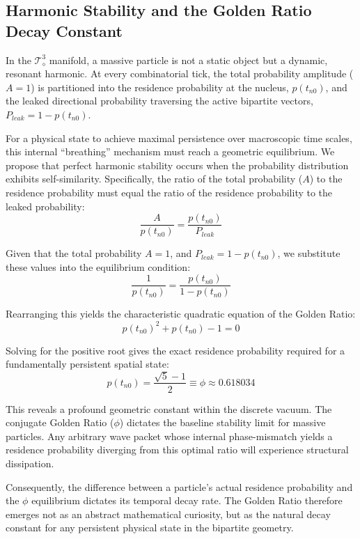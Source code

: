 \subsection{Harmonic Stability and the Golden Ratio Decay Constant}
\label{subsec:golden_ratio}

In the $\mathcal{T}_\diamond^3$ manifold, a massive particle is not a static object but
a dynamic, resonant harmonic. At every combinatorial tick, the total probability 
amplitude ($A=1$) is partitioned into the residence probability at the nucleus, 
$p(t_{n0})$, and the leaked directional probability traversing the active bipartite 
vectors, $P_{leak} = 1 - p(t_{n0})$. 

For a physical state to achieve maximal persistence over macroscopic time scales, 
this internal ``breathing'' mechanism must reach a geometric equilibrium. We propose 
that perfect harmonic stability occurs when the probability distribution exhibits 
self-similarity. Specifically, the ratio of the total probability ($A$) to the 
residence probability must equal the ratio of the residence probability to the leaked 
probability:
\begin{equation}
    \frac{A}{p(t_{n0})} = \frac{p(t_{n0})}{P_{leak}}
\end{equation}

Given that the total probability $A = 1$, and $P_{leak} = 1 - p(t_{n0})$, we substitute these 
values into the equilibrium condition:
\begin{equation}
    \frac{1}{p(t_{n0})} = \frac{p(t_{n0})}{1 - p(t_{n0})}
\end{equation}

Rearranging this yields the characteristic quadratic equation of the Golden Ratio:
\begin{equation}
    p(t_{n0})^2 + p(t_{n0}) - 1 = 0
\end{equation}

Solving for the positive root gives the exact residence probability required for a fundamentally persistent spatial state:
\begin{equation}
    p(t_{n0}) = \frac{\sqrt{5} - 1}{2} \equiv \phi \approx 0.618034
\end{equation}

This reveals a profound geometric constant within the discrete vacuum. The conjugate Golden Ratio ($\phi$) dictates the baseline 
stability limit for massive particles. Any arbitrary wave packet whose internal phase-mismatch yields a residence probability 
diverging from this optimal ratio will experience structural dissipation. 

Consequently, the difference between a particle's actual residence probability and the $\phi$ equilibrium dictates its temporal 
decay rate. The Golden Ratio therefore emerges not as an abstract mathematical curiosity, but as the natural decay constant for 
any persistent physical state in the bipartite geometry.